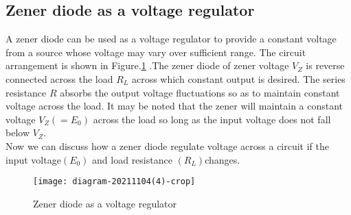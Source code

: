 \subsection{Zener diode as a voltage regulator}
\par A zener diode can be used as a voltage regulator to provide a constant voltage from a source whose voltage may vary over sufficient range. The circuit arrangement is shown in Figure.\ref{Zener as regulator} .The zener diode of zener voltage $V_{Z}$ is reverse connected across the load $R_{L}$ across which constant output is desired. The series resistance $R$ absorbs the output voltage fluctuations so as to maintain constant voltage across the load. It may be noted that the zener will maintain a constant voltage $V_{Z}\left(=E_{0}\right)$ across the load so long as the input voltage does not fall below $V_{Z}$.\\
 Now we can discuss how a zener diode regulate voltage across a circuit if the input voltage$(E_0)$ and load resistance $(R_L)$changes.
\begin{figure}[H]
\centering
\texttt{[image: diagram-20211104(4)-crop]}
\caption{Zener diode as a voltage regulator}
\label{Zener as regulator}
\end{figure}

